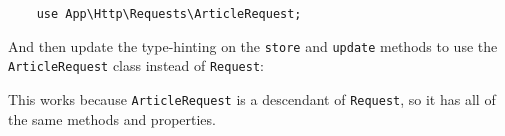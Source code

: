 \begin{verbatim}
    use App\Http\Requests\ArticleRequest;
\end{verbatim}

And then update the type-hinting on the \texttt{store} and \texttt{update} methods to use the \texttt{ArticleRequest} class instead of \texttt{Request}:


This works because \texttt{ArticleRequest} is a descendant of \texttt{Request}, so it has all of the same methods and properties.


